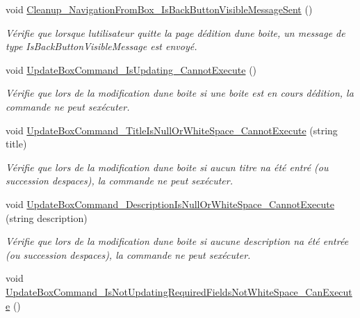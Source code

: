 \begin{DoxyCompactItemize}
void \hyperlink{class_boxes_1_1_tests_1_1_edit_box_view_model_tests_a0514d09d892d955583d145ced48f7386}{Cleanup\+\_\+\+Navigation\+From\+Box\+\_\+\+Is\+Back\+Button\+Visible\+Message\+Sent} ()
\begin{DoxyCompactList}\small\item\em Vérifie que lorsque l\textquotesingle{}utilisateur quitte la page d\textquotesingle{}édition d\textquotesingle{}une boite, un message de type Is\+Back\+Button\+Visible\+Message est envoyé. \end{DoxyCompactList}\item 
void \hyperlink{class_boxes_1_1_tests_1_1_edit_box_view_model_tests_a8ff57496b8b6168a90d0cf7f9c8ac9b8}{Update\+Box\+Command\+\_\+\+Is\+Updating\+\_\+\+Cannot\+Execute} ()
\begin{DoxyCompactList}\small\item\em Vérifie que lors de la modification d\textquotesingle{}une boite si une boite est en cours d\textquotesingle{}édition, la commande ne peut s\textquotesingle{}exécuter. \end{DoxyCompactList}\item 
void \hyperlink{class_boxes_1_1_tests_1_1_edit_box_view_model_tests_ab4e22da34a4559f1878d32f1dc7e79b7}{Update\+Box\+Command\+\_\+\+Title\+Is\+Null\+Or\+White\+Space\+\_\+\+Cannot\+Execute} (string title)
\begin{DoxyCompactList}\small\item\em Vérifie que lors de la modification d\textquotesingle{}une boite si aucun titre n\textquotesingle{}a été entré (ou succession d\textquotesingle{}espaces), la commande ne peut s\textquotesingle{}exécuter. \end{DoxyCompactList}\item 
void \hyperlink{class_boxes_1_1_tests_1_1_edit_box_view_model_tests_a333b7c99cbdbee2d010111a01db3db08}{Update\+Box\+Command\+\_\+\+Description\+Is\+Null\+Or\+White\+Space\+\_\+\+Cannot\+Execute} (string description)
\begin{DoxyCompactList}\small\item\em Vérifie que lors de la modification d\textquotesingle{}une boite si aucune description n\textquotesingle{}a été entrée (ou succession d\textquotesingle{}espaces), la commande ne peut s\textquotesingle{}exécuter. \end{DoxyCompactList}\item 
void \hyperlink{class_boxes_1_1_tests_1_1_edit_box_view_model_tests_abe1d5fcd5490db59eb5d08e7dc025987}{Update\+Box\+Command\+\_\+\+Is\+Not\+Updating\+Required\+Fields\+Not\+White\+Space\+\_\+\+Can\+Execute} ()

\end{DoxyCompactItemize}
